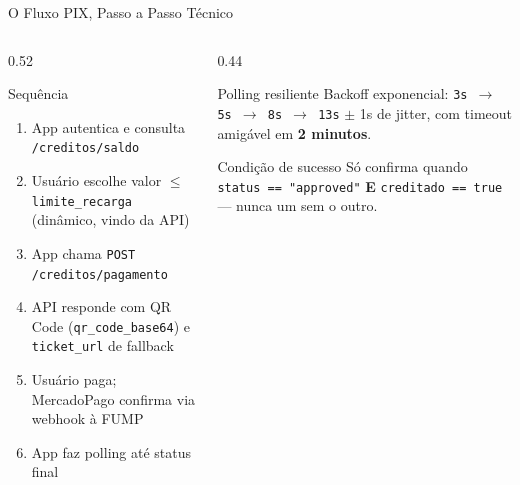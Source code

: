\documentclass[10pt, aspectratio=169]{beamer}
\begin{document}
\begin{frame}{O Fluxo PIX, Passo a Passo Técnico}
    \begin{columns}[T]
        \begin{column}{0.52\textwidth}
            \begin{block}{Sequência}
                \small
                \begin{enumerate}
                    \item App autentica e consulta \texttt{/creditos/saldo}
                    \item Usuário escolhe valor $\leq$ \texttt{limite\_recarga} (dinâmico, vindo da API)
                    \item App chama \texttt{POST /creditos/pagamento}
                    \item API responde com QR Code (\texttt{qr\_code\_base64}) e \texttt{ticket\_url} de fallback
                    \item Usuário paga; MercadoPago confirma via webhook à FUMP
                    \item App faz polling até status final
                \end{enumerate}
            \end{block}
        \end{column}
        \begin{column}{0.44\textwidth}
            \begin{alertblock}{Polling resiliente}
                \small
                Backoff exponencial: \texttt{3s $\to$ 5s $\to$ 8s $\to$ 13s} $\pm$ 1s de jitter, com timeout amigável em \textbf{2 minutos}.
            \end{alertblock}
            \vspace{0.25cm}
            \begin{exampleblock}{Condição de sucesso}
                \small
                Só confirma quando \texttt{status == "approved"} \textbf{E} \texttt{creditado == true} --- nunca um sem o outro.
            \end{exampleblock}
        \end{column}
    \end{columns}
\end{frame}
\end{document}
